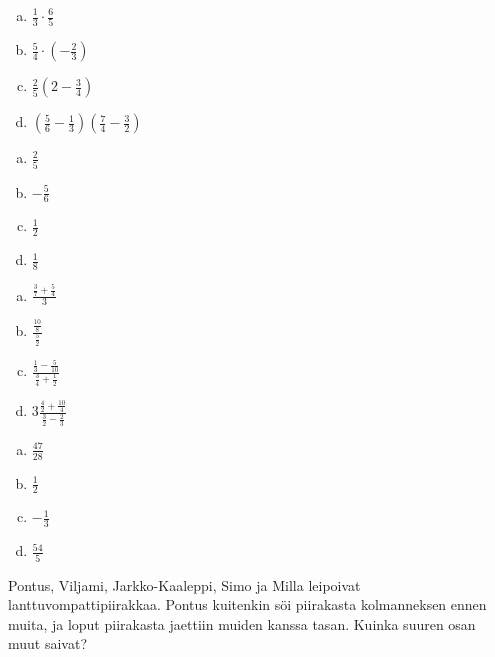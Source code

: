 \begin{tehtavasivu}
\begin{tehtava}
        \begin{enumerate}[a)]
        	\item $\frac{1}{3} \cdot \frac{6}{5}$
        	\item $\frac{5}{4} \cdot (-\frac{2}{3})$ 
        	\item $\frac{2}{5} (2 - \frac{3}{4})$
        	\item $(\frac{5}{6} - \frac{1}{3})(\frac{7}{4} - \frac{3}{2})$
        \end{enumerate}
            \begin{vastaus}		
        		\begin{enumerate}[a)]
        			\item $\frac{2}{5}$
        			\item $-\frac{5}{6}$
        			\item $\frac{1}{2}$
        			\item $\frac{1}{8}$ 
        		\end{enumerate}
            \end{vastaus}
        \end{tehtava}
        
        \begin{tehtava}
        
        \begin{enumerate}[a)]
        	\item $\displaystyle \frac{\frac{3}{7} + \frac{5}{4}}{3}$
        	\item $\displaystyle \frac{\frac{10}{8}}{\frac{5}{2}}$
        	\item $\displaystyle \frac{\frac{1}{3} - \frac{5}{10}}{\frac{3}{4} + \frac{1}{2}}$
        	\item $\displaystyle 3\frac{\frac{4}{2} + \frac{10}{4}}{\frac{3}{2} - \frac{2}{3}}$
        \end{enumerate}
            \begin{vastaus}		
        		\begin{enumerate}[a)]
        			\item $\frac{47}{28}$
        			\item $\frac{1}{2}$
        			\item $-\frac{1}{3}$
        			\item $\frac{54}{5}$
        		\end{enumerate}
            \end{vastaus}
        \end{tehtava}
    
    \begin{tehtava} %
        Pontus, Viljami, Jarkko-Kaaleppi, Simo ja Milla leipoivat lanttuvompattipiirakkaa.
        Pontus kuitenkin söi piirakasta kolmanneksen ennen muita, ja loput piirakasta
        jaettiin muiden kanssa tasan. Kuinka suuren osan muut saivat?
        

\end{tehtava}
\end{tehtavasivu}
